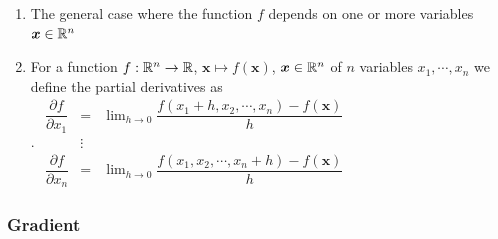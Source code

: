 \begin{enumerate}
    \item 
    \begin{definition}
        The general case where the function $f$ depends on one or more variables $\bm{x} \in \mathbb{R}^n$
        \hfill \cite{mfml/book/mml/Deisenroth-Faisal-Ong}
    \end{definition}

    \item 
    \begin{definition}
        For a function $f : \mathbb{R}^n \to \mathbb{R}$, $\bm{x} \mapsto f (\bm{x})$, $\bm{x} \in \mathbb{R}^n$ of $n$ variables $x_1, \cdots , x_n$ we define the partial derivatives as
        \hfill \cite{mfml/book/mml/Deisenroth-Faisal-Ong}
        \\
        .\hfill
        ${
            \displaystyle
            \begin{matrix}
                \dfrac{\partial f}{\partial x_1} 
                & 
                = 
                & 
                \lim_{h\to 0} \dfrac{f (x_1 + h, x_2, \cdots , x_n) - f (\bm{x})}{h}
                \\
                & \vdots &
                \\
                \dfrac{\partial f}{\partial x_n} 
                & 
                = 
                & 
                \lim_{h\to 0} \dfrac{f (x_1 , x_2, \cdots , x_n+ h) - f (\bm{x})}{h}
            \end{matrix}
        }$
        \hfill \cite{mfml/book/mml/Deisenroth-Faisal-Ong}
    \end{definition}
\end{enumerate}

\subsubsection{Gradient}


